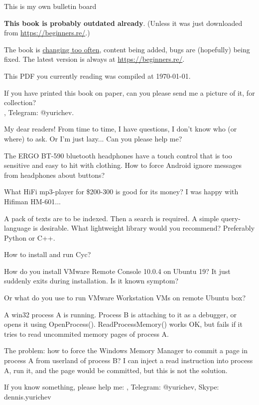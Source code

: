 
\begin{center}
\LARGE{} This is my own bulletin board \normalsize{}
\end{center}

\textbf{This book is probably outdated already}.
(Unless it was just downloaded from \url{https://beginners.re/}.)

The book is \href{https://github.com/DennisYurichev/RE-for-beginners/commits/master}{changing too often},
content being added, bugs are (hopefully) being fixed.
The latest version is always at \url{https://beginners.re/}.

This PDF you currently reading was compiled at \today{}.

\myhrule{}

If you have printed this book on paper, can you please send me a picture of it, for collection?\\
\EMAIL{}, Telegram: @yurichev.

\myhrule{}

My dear readers! From time to time, I have questions, I don't know who (or where) to ask.
Or I'm just lazy...
Can you please help me?

\myhrule{}

The ERGO BT-590 bluetooth headphones have a touch control that is too sensitive and easy to hit with clothing.
How to force Android ignore messages from headphones about buttons?

\myhrule{}

What HiFi mp3-player for \$200-300 is good for its money?
I was happy with Hifiman HM-601...

\myhrule{}

A pack of texts are to be indexed. Then a search is required. A simple query-language is desirable.
What lightweight library would you recommend?
Preferably Python or C++.

\myhrule{}

How to install and run Cyc?

\myhrule{}

How do you install VMware Remote Console 10.0.4 on Ubuntu 19? It just suddenly exits during installation.
Is it known symptom?

Or what do you use to run VMware Workstation VMs on remote Ubuntu box?

\myhrule{}

A win32 process A is running.
Process B is attaching to it as a debugger, or opens it using OpenProcess().
ReadProcessMemory() works OK, but fails if it tries to read uncommited memory pages of process A.

The problem: how to force the Windows Memory Manager to commit a page in process A from userland of process B?
I can inject a read instruction into process A, run it, and the page would be committed, but this is not the solution.

\myhrule{}

If you know something, please help me: \EMAIL{}, Telegram: @yurichev, Skype: dennis.yurichev

